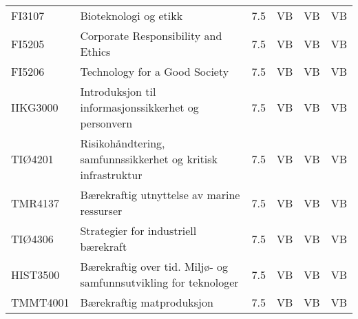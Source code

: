 \documentclass{article}
\begin{document}
\begin{table}
\begin{tabular}{llllll}
    FI3107   & Bioteknologi   og etikk                                            & 7.5 & VB & VB & VB \\
    FI5205   & Corporate   Responsibility and Ethics                              & 7.5 & VB & VB & VB \\
    FI5206   & Technology   for a Good Society                                    & 7.5 & VB & VB & VB \\
    IIKG3000 & Introduksjon   til informasjonssikkerhet og personvern             & 7.5 & VB & VB & VB \\
    TIØ4201  & Risikohåndtering,   samfunnssikkerhet og kritisk infrastruktur     & 7.5 & VB & VB & VB \\
    TMR4137  & Bærekraftig   utnyttelse av marine ressurser                       & 7.5 & VB & VB & VB \\
    TIØ4306  & Strategier   for industriell bærekraft                             & 7.5 & VB & VB & VB \\
    HIST3500 & Bærekraftig   over tid. Miljø- og samfunnsutvikling for teknologer & 7.5 & VB & VB & VB \\
    TMMT4001 & Bærekraftig   matproduksjon                                        & 7.5 & VB & VB & VB
  \end{tabular}
\end{table}



\end{document}
